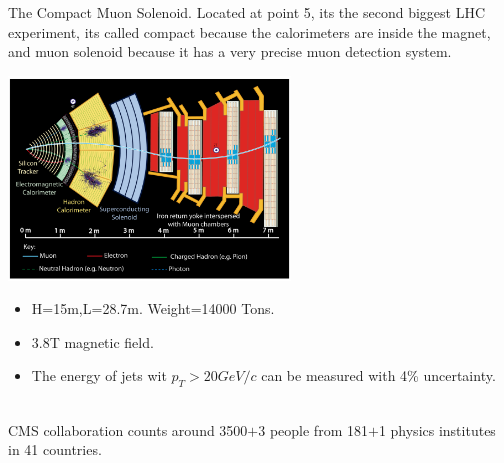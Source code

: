 \documentclass[8pt]{beamer}
\begin{document}
\begin{frame}[fragile]{The Compact Muon Solenoid.}
	Located at point 5, its the second biggest LHC experiment, its called compact because the calorimeters are inside the magnet, and muon solenoid because it has a very precise muon detection system.
	
	\vspace{0.5cm}
	\begin{minipage}{0.7\textwidth}%
		\includegraphics[width=7.5cm]{9}
	\end{minipage}%
	\hfill%
	\begin{minipage}{0.3\textwidth}\raggedleft
		\begin{itemize}
			\item H=15m,L=28.7m. Weight=14000 Tons.		
			\item 3.8T magnetic field.
			\item The energy of jets wit $p_T>20GeV/c$ can be measured with 4\% uncertainty.
			
		\end{itemize}
	\end{minipage}
	\\
	\vspace{0.5cm}
	CMS collaboration counts around 3500$+$3 people from 181$+$1 physics institutes in 41 countries.
\end{frame} 

\end{document}
